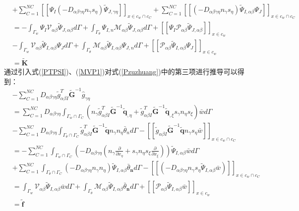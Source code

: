 \begin{equation}
\begin{split}
    &+\sum_{C=1}^{N\!C}[[\Psi_I(-D_{\alpha\beta\gamma\eta}n_{\gamma}s_{\eta})\tilde{\Psi}_{J,\gamma\eta}]]_{x\in{c_w}\cap{c_C}}+\sum_{C=1}^{N\!C}[[(-D_{\alpha\beta\gamma\eta}n_{\gamma}s_{\eta})\tilde{\Psi}_{I,\alpha\beta}\Psi_J]]_{x\in{c_w}\cap{c_C}}\\
    &=-\int_{\Gamma_w}\Psi_I\mathcal{V}_{\alpha\beta}\tilde{\Psi}_{J,\alpha\beta}d\Gamma+\int_{\Gamma_{\theta}}\Psi_{I,n}\mathcal{M}_{\alpha\beta}\tilde{\Psi}_{J,\alpha\beta}d\Gamma+[[\Psi_I\mathcal{P}_{\alpha\beta}\tilde{\Psi}_{J,\alpha\beta}]]_{x\in{c_w}}\\
    &-\int_{\Gamma_w}\mathcal{V}_{\alpha\beta}\tilde{\Psi}_{I,\alpha\beta}\Psi_Jd\Gamma+\int_{\Gamma_{\theta}}\mathcal{M}_{\alpha\beta}\tilde{\Psi}_{I,\alpha\beta}\Psi_{J,n}d\Gamma+[[\mathcal{P}_{\alpha\beta}\tilde{\Psi}_{I,\alpha\beta}\Psi_J]]_{x\in{c_w}}\\
    &=\tilde{\pmb K}
\end{split}
\end{equation}
通过引入式(\ref{PTPSI})、(\ref{MVP1})对式(\ref{Pzuzhuang})中的第三项进行推导可以得到：
\begin{equation}
\begin{split}
    &-\sum_{C=1}^{N\!C}D_{\alpha\beta\gamma\eta}\tilde{g}^T_{\alpha\beta I}\tilde{\pmb G}^{-1}\hat{g}_{\gamma\eta}\\
    &=\sum_{C=1}^{N\!C}D_{\alpha\beta\gamma\eta}\int_{{\Gamma_w}\cap{\Gamma_C}}(n_{\gamma}
    \tilde{g}_{\alpha\beta I}^T\tilde{\pmb G}^{-1}\tilde{\pmb q}_{,\eta}+\tilde{g}_{\alpha\beta I}^T
    \tilde{\pmb G}^{-1}\tilde{\pmb q}_{,\xi}s_{\gamma}n_{\eta}s_{\xi})\bar{w}d\Gamma\\
    &-\sum_{C=1}^{N\!C}D_{\alpha\beta\gamma\eta}\int_{{\Gamma_{\theta}}\cap{\Gamma_{C}}}\tilde{g}^T_{\alpha\beta I}\tilde{\pmb G}^{-1}\tilde{\pmb q}n_{\gamma}n_{\eta}\bar{\theta}_nd\Gamma-[[\tilde{g}_{\alpha\beta I}\tilde{\pmb G}^{-1}\tilde{\pmb q}n_{\gamma}s_{\eta}\bar{w}]]_{x\in{c_w}\cap{c_C}}\\
    &=-\sum_{C=1}^{N\!C}\int_{{\Gamma_w}\cap{\Gamma_C}}(-D_{\alpha\beta\gamma\eta}(n_{\gamma}\frac{\partial}{\partial x_{\eta}}+s_{\gamma}n_{\eta}s_{\xi}\frac{\partial}{\partial x_{\xi}}))\tilde{\Psi}_{I,\alpha\beta}\bar{w}d\Gamma\\
    &+\sum_{C=1}^{N\!C}\int_{{\Gamma_{\theta}}\cap{\Gamma_C}}(-D_{\alpha\beta\gamma\eta}n_{\gamma}n_{\eta})\tilde{\Psi}_{I,\alpha\beta}\bar{\theta}_{\pmb n}d\Gamma-[[(-D_{\alpha\beta\gamma\eta}n_{\gamma}s_{\eta}\tilde{\Psi}_{I,\alpha\beta}\bar{w})]]_{x\in{c_w}\cap{c_C}}\\
    &=\int_{\Gamma_w}\mathcal{V}_{\alpha\beta}\tilde{\Psi}_{I,\alpha\beta}\bar{w}d\Gamma+\int_{\Gamma_{\theta}}\mathcal{M}_{\alpha\beta}\tilde{\Psi}_{I,\alpha\beta}\bar{\theta}_{\pmb n}d\Gamma+[[\mathcal{P}_{\alpha\beta}\tilde{\Psi}_{I,\alpha\beta}\bar{w}]]_{x\in{c_w}}\\
    &=\tilde{\pmb f}
\end{split}
\end{equation}
